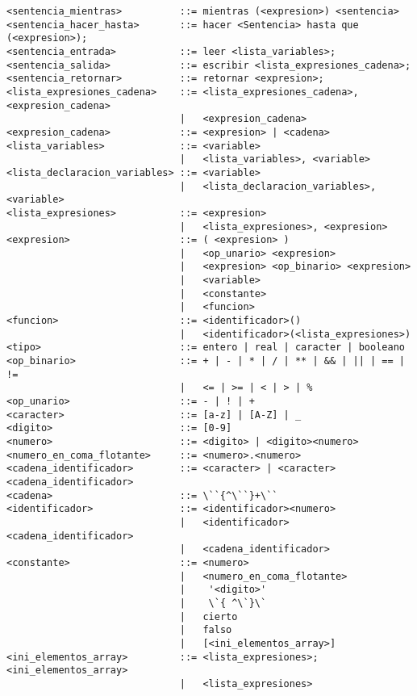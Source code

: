 \begin{lstlisting}[breaklines=true, basicstyle=\tiny]
<sentencia_mientras>          ::= mientras (<expresion>) <sentencia>
<sentencia_hacer_hasta>       ::= hacer <Sentencia> hasta que (<expresion>);
<sentencia_entrada>           ::= leer <lista_variables>;
<sentencia_salida>            ::= escribir <lista_expresiones_cadena>;
<sentencia_retornar>          ::= retornar <expresion>;
<lista_expresiones_cadena>    ::= <lista_expresiones_cadena>, <expresion_cadena>
                              |   <expresion_cadena>
<expresion_cadena>            ::= <expresion> | <cadena>
<lista_variables>             ::= <variable>
                              |   <lista_variables>, <variable>
<lista_declaracion_variables> ::= <variable>
                              |   <lista_declaracion_variables>, <variable>
<lista_expresiones>           ::= <expresion>
                              |   <lista_expresiones>, <expresion>
<expresion>                   ::= ( <expresion> )
                              |   <op_unario> <expresion>
                              |   <expresion> <op_binario> <expresion>
                              |   <variable>
                              |   <constante>
                              |   <funcion>
<funcion>                     ::= <identificador>()
                              |   <identificador>(<lista_expresiones>)
<tipo>                        ::= entero | real | caracter | booleano
<op_binario>                  ::= + | - | * | / | ** | && | || | == | !=
                              |   <= | >= | < | > | %
<op_unario>                   ::= - | ! | +
<caracter>                    ::= [a-z] | [A-Z] | _
<digito>                      ::= [0-9]
<numero>                      ::= <digito> | <digito><numero>
<numero_en_coma_flotante>     ::= <numero>.<numero>
<cadena_identificador>        ::= <caracter> | <caracter><cadena_identificador>
<cadena>                      ::= \``{^\``}+\`` 
<identificador>               ::= <identificador><numero>
                              |   <identificador><cadena_identificador>
                              |   <cadena_identificador>
<constante>                   ::= <numero>
                              |   <numero_en_coma_flotante>
                              |    '<digito>'
                              |    \`{ ^\`}\`
                              |   cierto
                              |   falso
                              |   [<ini_elementos_array>]
<ini_elementos_array>         ::= <lista_expresiones>; <ini_elementos_array>
                              |   <lista_expresiones>
\end{lstlisting}


